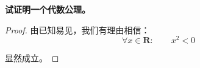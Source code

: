 \textbf{试证明一个代数公理。}\\
\begin{proof}

由已知易见，我们有理由相信：
\begin{equation}
\forall x \in \mathbf{R}:
\qquad x^2<0
\end{equation}

显然成立。
\end{proof}
